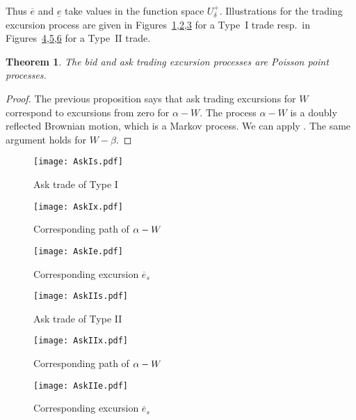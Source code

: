 \documentclass[11pt]{scrartcl}
\newtheorem{theorem}{Theorem}
\begin{document}
Thus $\overline{e}$ and $\underline{e}$ take values in the function space $U_\delta^+$. Illustrations for the trading excursion process are given in
Figures~\ref{Fig:AskIs},\ref{Fig:AskIx},\ref{Fig:AskIe} for a Type~{I} trade
resp.\ in Figures~\ref{Fig:AskIIs},\ref{Fig:AskIIx},\ref{Fig:AskIIe} for a
Type~{II} trade.

\begin{theorem}
The bid and ask trading excursion processes are Poisson point processes.
\end{theorem}

\begin{proof}
The previous proposition says that ask trading excursions for $W$ correspond to excursions from zero for $\alpha-W$. The process $\alpha-W$ is a doubly reflected Brownian motion, which is a Markov process.
We can apply \cite[Thm.3.18, p.95]{Blu}. The same argument holds for $W-\beta$.
\end{proof}
\begin{figure}[H]
\texttt{[image: AskIs.pdf]}
\caption{Ask trade of Type I}
\label{Fig:AskIs}
\end{figure}
\begin{figure}[H]
\texttt{[image: AskIx.pdf]}
\caption{Corresponding path of $\protect\alpha-W$}
\label{Fig:AskIx}
\end{figure}
\begin{figure}[H]
\texttt{[image: AskIe.pdf]}
\caption{Corresponding excursion $\overline{e}_s$}
\label{Fig:AskIe}
\end{figure}


\begin{figure}[H]
\texttt{[image: AskIIs.pdf]}
\caption{Ask trade of Type II}
\label{Fig:AskIIs}
\end{figure}
\begin{figure}[H]
\texttt{[image: AskIIx.pdf]}
\caption{Corresponding path of $\protect\alpha-W$}
\label{Fig:AskIIx}
\end{figure}
\begin{figure}[H]
\texttt{[image: AskIIe.pdf]}
\caption{Corresponding excursion $\overline{e}_s$}
\label{Fig:AskIIe}
\end{figure}
\end{document}

